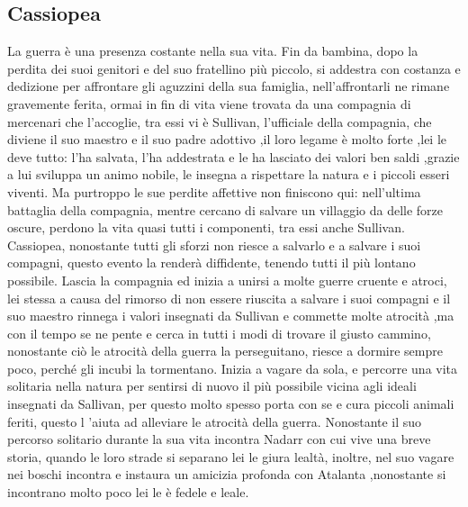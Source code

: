 \documentclass{article}
\begin{document}
\subsection{Cassiopea}La guerra è una presenza costante nella sua vita. Fin da bambina, dopo la perdita dei suoi genitori e del suo fratellino più piccolo, si addestra con costanza e dedizione per affrontare gli aguzzini della sua famiglia, nell’affrontarli ne rimane gravemente ferita, ormai in fin di vita viene trovata da una compagnia di mercenari che l’accoglie, tra essi vi è Sullivan, l’ufficiale della compagnia, che diviene il suo maestro e il suo padre adottivo ,il loro legame è molto forte ,lei le deve tutto: l’ha salvata, l’ha addestrata e le ha lasciato dei valori ben saldi ,grazie a lui sviluppa un animo nobile, le insegna a rispettare la natura e i piccoli esseri viventi. Ma purtroppo le sue perdite affettive non finiscono qui: nell’ultima battaglia della compagnia, mentre cercano di salvare un villaggio da delle forze oscure, perdono la vita quasi tutti i componenti, tra essi anche Sullivan. Cassiopea, nonostante tutti gli sforzi non riesce a salvarlo e a salvare i suoi compagni, questo evento la renderà diffidente, tenendo tutti il più lontano possibile. Lascia la compagnia ed inizia a unirsi a molte guerre cruente e atroci, lei stessa a causa del rimorso di non essere riuscita a salvare i suoi compagni e il suo maestro rinnega i valori insegnati da Sullivan e commette molte atrocità ,ma con il tempo se ne pente e cerca in tutti i modi di trovare il giusto cammino, nonostante ciò le atrocità della guerra la perseguitano, riesce a dormire sempre poco, perché gli incubi la tormentano. Inizia a vagare da sola, e percorre una vita solitaria nella natura per sentirsi di nuovo il più possibile vicina agli ideali insegnati da Sallivan, per questo molto spesso porta con se e cura piccoli animali feriti, questo l ’aiuta ad alleviare le atrocità della guerra. Nonostante il suo percorso solitario durante la sua vita incontra Nadarr con cui vive una breve storia, quando le loro strade si separano lei le giura lealtà, inoltre, nel suo vagare nei boschi incontra e instaura un amicizia profonda con Atalanta ,nonostante si incontrano molto poco lei le è fedele e leale.
\end{document}
